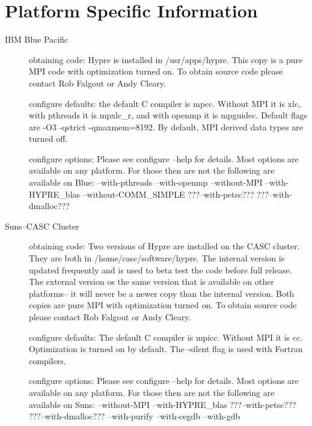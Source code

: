 \section{Platform Specific Information}
\begin{description}

\item[IBM Blue Pacific]
obtaining code:
\newline
Hypre is installed in /usr/apps/hypre.  This copy is a pure MPI code with optimization turned on.  To obtain source code please contact Rob Falgout or Andy Cleary.
\newline

configure defaults:
\newline
the default C compiler is mpcc.  Without MPI it is xlc, with pthreads it is mpxlc_r, and with openmp it is mpguidec.  Default flags are -O3 -qstrict -qmaxmem=8192.  By default, MPI derived data types are turned off.      
\newline

configure options:
\newline
Please see configure --help for details.  Most options are available on any platform.  For those then are not the following are available on Blue:  --with-pthreads --with-openmp --without-MPI --with-HYPRE_blas --without-COMM_SIMPLE ???--with-petsc???  ???--with-dmalloc???
\newline


\item[Suns--CASC Cluster]
obtaining code:
\newline
Two versions of Hypre are installed on the CASC cluster.  They are both in /home/casc/software/hypre.  The internal version is updated frequently and is used to beta test the code before full release.  The external version os the same version that is available on other platforms-- it will never be a newer copy than the internal version.  Both copies are pure MPI with optimization turned on. To obtain source code please contact Rob Falgout or Andy Cleary.
\newline

configure defaults:
\newline
The default C compiler is mpicc.  Without MPI it is cc.  Optimization is turned on by default.  The -silent flag is used with Fortran compilers.  
\newline

configure options:
\newline
Please see configure --help for details.  Most options are available on any platform.  For those then are not the following are available on Suns:  --without-MPI --with-HYPRE_blas ???--with-petsc???  ???--with-dmalloc??? --with-purify --with-cegdb --with-gdb
\newline


\end{description}
